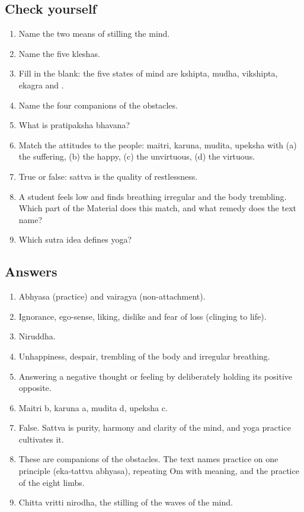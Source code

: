 \subsection*{Check yourself}
\begin{enumerate}
\item Name the two means of stilling the mind.
\item Name the five kleshas.
\item Fill in the blank: the five states of mind are kshipta, mudha, vikshipta, ekagra and \underline{\hspace{2cm}}.
\item Name the four companions of the obstacles.
\item What is pratipaksha bhavana?
\item Match the attitudes to the people: maitri, karuna, mudita, upeksha with (a) the suffering, (b) the happy, (c) the unvirtuous, (d) the virtuous.
\item True or false: sattva is the quality of restlessness.
\item A student feels low and finds breathing irregular and the body trembling. Which part of the Material does this match, and what remedy does the text name?
\item Which sutra idea defines yoga?
\end{enumerate}

\subsection*{Answers}
\begin{enumerate}
\item Abhyasa (practice) and vairagya (non-attachment).
\item Ignorance, ego-sense, liking, dislike and fear of loss (clinging to life).
\item Niruddha.
\item Unhappiness, despair, trembling of the body and irregular breathing.
\item Answering a negative thought or feeling by deliberately holding its positive opposite.
\item Maitri b, karuna a, mudita d, upeksha c.
\item False. Sattva is purity, harmony and clarity of the mind, and yoga practice cultivates it.
\item These are companions of the obstacles. The text names practice on one principle (eka-tattva abhyasa), repeating Om with meaning, and the practice of the eight limbs.
\item Chitta vritti nirodha, the stilling of the waves of the mind.
\end{enumerate}

